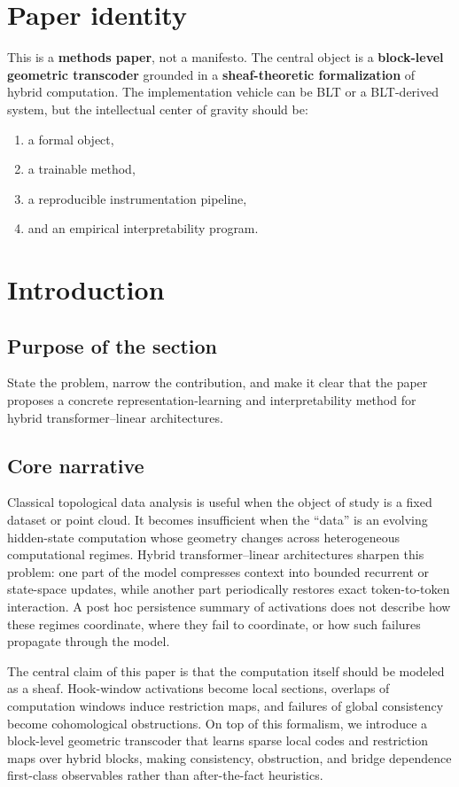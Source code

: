 \documentclass[11pt]{article}
\begin{document}
\section*{Paper identity}

This is a \textbf{methods paper}, not a manifesto. The central object is a \textbf{block-level geometric transcoder} grounded in a \textbf{sheaf-theoretic formalization} of hybrid computation. The implementation vehicle can be BLT or a BLT-derived system, but the intellectual center of gravity should be:
\begin{enumerate}[leftmargin=1.5em]
    \item a formal object,
    \item a trainable method,
    \item a reproducible instrumentation pipeline,
    \item and an empirical interpretability program.
\end{enumerate}

\section{Introduction}

\subsection*{Purpose of the section}
State the problem, narrow the contribution, and make it clear that the paper proposes a concrete representation-learning and interpretability method for hybrid transformer--linear architectures.

\subsection*{Core narrative}
Classical topological data analysis is useful when the object of study is a fixed dataset or point cloud. It becomes insufficient when the ``data'' is an evolving hidden-state computation whose geometry changes across heterogeneous computational regimes. Hybrid transformer--linear architectures sharpen this problem: one part of the model compresses context into bounded recurrent or state-space updates, while another part periodically restores exact token-to-token interaction. A post hoc persistence summary of activations does not describe how these regimes coordinate, where they fail to coordinate, or how such failures propagate through the model.

The central claim of this paper is that the computation itself should be modeled as a sheaf. Hook-window activations become local sections, overlaps of computation windows induce restriction maps, and failures of global consistency become cohomological obstructions. On top of this formalism, we introduce a block-level geometric transcoder that learns sparse local codes and restriction maps over hybrid blocks, making consistency, obstruction, and bridge dependence first-class observables rather than after-the-fact heuristics.
\end{document}
